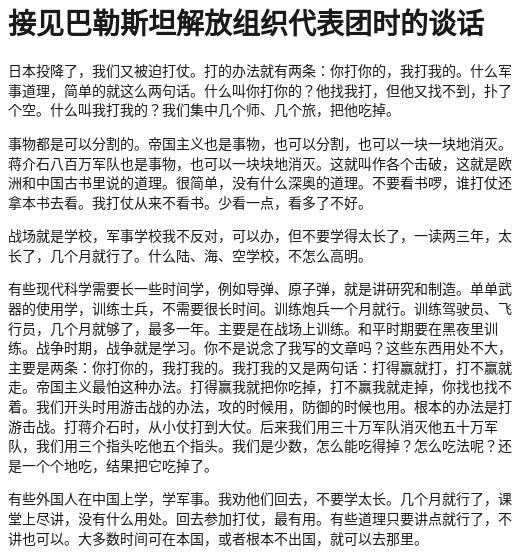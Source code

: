 \section[接见巴勒斯坦解放组织代表团时的谈话（一九六五年三月）]{接见巴勒斯坦解放组织代表团时的谈话}


日本投降了，我们又被迫打仗。打的办法就有两条：你打你的，我打我的。什么军事道理，简单的就这么两句话。什么叫你打你的？他找我打，但他又找不到，扑了个空。什么叫我打我的？我们集中几个师、几个旅，把他吃掉。

事物都是可以分割的。帝国主义也是事物，也可以分割，也可以一块一块地消灭。蒋介石八百万军队也是事物，也可以一块块地消灭。这就叫作各个击破，这就是欧洲和中国古书里说的道理。很简单，没有什么深奥的道理。不要看书啰，谁打仗还拿本书去看。我打仗从来不看书。少看一点，看多了不好。

战场就是学校，军事学校我不反对，可以办，但不要学得太长了，一读两三年，太长了，几个月就行了。什么陆、海、空学校，不怎么高明。

有些现代科学需要长一些时间学，例如导弹、原子弹，就是讲研究和制造。单单武器的使用学，训练士兵，不需要很长时间。训练炮兵一个月就行。训练驾驶员、飞行员，几个月就够了，最多一年。主要是在战场上训练。和平时期要在黑夜里训练。战争时期，战争就是学习。你不是说念了我写的文章吗？这些东西用处不大，主要是两条：你打你的，我打我的。我打我的又是两句话：打得赢就打，打不赢就走。帝国主义最怕这种办法。打得赢我就把你吃掉，打不赢我就走掉，你找也找不着。我们开头时用游击战的办法，攻的时候用，防御的时候也用。根本的办法是打游击战。打蒋介石时，从小仗打到大仗。后来我们用三十万军队消灭他五十万军队，我们用三个指头吃他五个指头。我们是少数，怎么能吃得掉？怎么吃法呢？还是一个个地吃，结果把它吃掉了。

有些外国人在中国上学，学军事。我劝他们回去，不要学太长。几个月就行了，课堂上尽讲，没有什么用处。回去参加打仗，最有用。有些道理只要讲点就行了，不讲也可以。大多数时间可在本国，或者根本不出国，就可以去那里。


